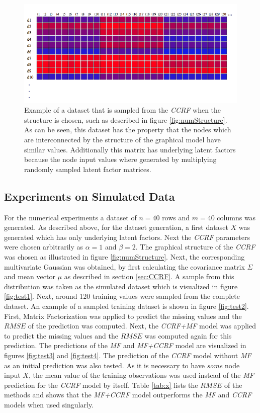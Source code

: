 \begin{figure}
\begin{center}
\includegraphics[scale=0.5]{numeric_sample.png}
\end{center}
\caption[Example of CCRF sample]{\large{Example of a dataset that is sampled from the \textit{CCRF} when the structure is chosen, such as described in figure \ref{fig:numStructure}. As can be seen, this dataset has the property that the nodes which are interconnected by the structure of the graphical model have similar values. Additionally this matrix has underlying latent factors because the node input values where generated by multiplying randomly sampled latent factor matrices.}}
\label{fig:numSample}
\end{figure}

\subsection{Experiments on Simulated Data}

For the numerical experiments a dataset of $n=40$ rows and $m=40$ columns was generated. As described above, for the dataset generation, a first dataset $X$ was generated which has only underlying latent factors. Next the \textit{CCRF} parameters were chosen arbitrarily as $\alpha=1$ and $\beta=2$. The graphical structure of the \textit{CCRF} was chosen as illustrated in figure \ref{fig:numStructure}. Next, the corresponding multivariate Gaussian was obtained, by first calculating the covariance matrix $\Sigma$ and mean vector $\mu$ as described in section \ref{sec:CCRF}. A sample from this distribution was taken as the simulated dataset which is visualized in figure \ref{fig:test1}. Next, around 120 training values were sampled from the complete dataset. An example of a sampled training dataset is shown in figure \ref{fig:test2}. First, Matrix Factorization was applied to predict the missing values and the $RMSE$ of the prediction was computed. Next, the \textit{CCRF+MF} model was applied to predict the missing values and the $RMSE$ was computed again for this prediction. The predictions of the \textit{MF} and \textit{MF+CCRF} model are visualized in figures \ref{fig:test3} and \ref{fig:test4}. The prediction of the \textit{CCRF} model without \textit{MF} as an initial prediction was also tested. As it is necessary to have \textit{some} node input $X$, the mean value of the training observations was used instead of the \textit{MF} prediction for the \textit{CCRF} model by itself. Table \ref{tab:x} lists the $RMSE$ of the methods and shows that the \textit{MF+CCRF} model outperforms the \textit{MF} and \textit{CCRF} models when used singularly.

